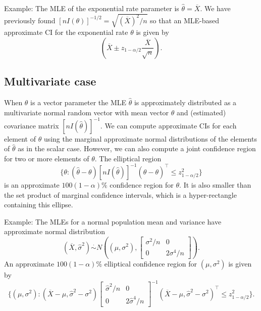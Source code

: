 \documentclass[
]{book}
\begin{document}
Example: The MLE of the exponential rate parameter is \(\hat\theta = \overline X\). We have previously found \([nI(\theta)]^{-1/2} = \sqrt{(\overline X)^2/n}\) so that an MLE-based approximate CI for the exponential rate \(\theta\) is given by
\[\left(\overline X \pm z_{1-\alpha/2}\frac{\overline X}{\sqrt{n}}\right).\]

\hypertarget{multivariate-case}{%
\subsection{Multivariate case}\label{multivariate-case}}

When \(\theta\) is a vector parameter the MLE \(\hat\theta\) is approximately distributed as a multivariate normal random vector with mean vector \(\theta\) and (estimated) covariance matrix \([nI(\hat\theta)]^{-1}\). We can compute approximate CIs for each element of \(\theta\) using the marginal approximate normal distributions of the elements of \(\hat\theta\) as in the scalar case. However, we can also compute a joint confidence region for two or more elements of \(\theta\). The elliptical region
\[\{\theta: (\hat \theta - \theta)[nI(\hat\theta)]^{-1}(\hat \theta - \theta)^\top \leq z_{1-\alpha/2}^2\}\]
is an approximate \(100(1-\alpha)\%\) confidence region for \(\theta\). It is also smaller than the set product of marginal confidence intervals, which is a hyper-rectangle containing this ellipse.

Example: The MLEs for a normal population mean and variance have approximate normal distribution
\[(\overline X, \hat\sigma^2) \stackrel{\cdot}{\sim}N\left((\mu, \sigma^2), \begin{bmatrix} \sigma^2/n & 0 \\ 0 & 2\sigma^4/n \end{bmatrix}\right).\]
An approximate \(100(1-\alpha)\%\) elliptical confidence region for \((\mu, \sigma^2)\) is given by
\[\{(\mu, \sigma^2): (\overline X - \mu, \hat\sigma^2 - \sigma^2)\begin{bmatrix} \hat\sigma^2/n & 0 \\ 0 & 2\hat\sigma^4/n \end{bmatrix}^{-1} (\overline X - \mu, \hat\sigma^2 - \sigma^2)^\top \leq z_{1-\alpha/2}^2\}.\]
\end{document}
